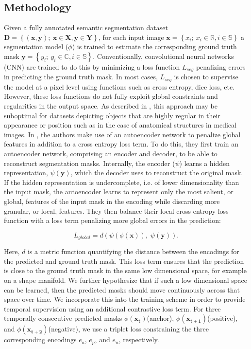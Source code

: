 \documentclass[twoside, print]{ieeecolor_arxiv}
\begin{document}
\subsection{Methodology}
Given a fully annotated semantic segmentation dataset $\mathbf{D} = \left\{ \left ( \mathbf{x },\mathbf{y}\right ); \: \mathbf{x}\in \mathbf{X} ,  \mathbf{y}\in \mathbf{Y}\right\}$, for each input image $\mathbf{x } = \left \{ x_{i};\: x_{i}\in \mathbb{R} , i \in \mathbb{S} \right\}$ a segmentation model ($\phi$) is trained to estimate the corresponding ground truth mask $\mathbf{y} = \left \{ y_{i};\: y_{i}\in \mathbb{C} , i \in \mathbb{S} \right\}$. Conventionally, convolutional neural networks (CNN) are trained to do this by minimizing a loss function $L_{seg}$ penalizing errors in predicting the ground truth mask. In most cases, $L_{seg}$ is chosen to supervise the model at a pixel level using functions such as cross entropy, dice loss, etc. However, these loss functions do not fully exploit global constraints and regularities in the output space. As described in \cite{acnn}, this approach may be suboptimal for datasets depicting objects that are highly regular in their appearance or position such as in the case of anatomical structures in medical images. In \cite{acnn}, the authors make use of an autoencoder network to penalize global features in addition to a cross entropy loss term. To do this, they first train an autoencoder network, comprising an encoder and decoder, to be able to reconstruct segmentation masks. Internally, the encoder ($\psi$) learns a hidden representation, $\psi(\mathbf{y})$, which the decoder uses to reconstruct the original mask. If the hidden representation is undercomplete, i.e. of lower dimensionality than the input mask, the autoencoder learns to represent only the most salient, or global, features of the input mask in the encoding while discarding more granular, or local, features. They then balance their local cross entropy loss function with a loss term penalizing more global errors in the prediction:

\begin{equation}
L_{global} = d(\psi(\phi(\mathbf{x})), \; \psi(\mathbf{y})).
\end{equation}

Here, $d$ is a metric function quantifying the distance between the encodings for the predicted and ground truth mask. This loss term ensures that the prediction is close to the ground truth mask in the same low dimensional space, for example on a shape manifold. We further hypothesize that if such a low dimensional space can be learned, then the predicted masks should move continuously across that space over time. We incorporate this into the training scheme in order to provide temporal supervision using an additional contrastive loss term. For three temporally consecutive predicted masks $\phi (\mathbf{x_{t}} )$(anchor), $\phi (\mathbf{x_{t+1}} )$(positive), and $\phi (\mathbf{x_{t+2}} )$(negative), we use a triplet loss constraining the three corresponding encodings $e_a$, $e_p$, and $e_n$, respectively. 
\end{document}
